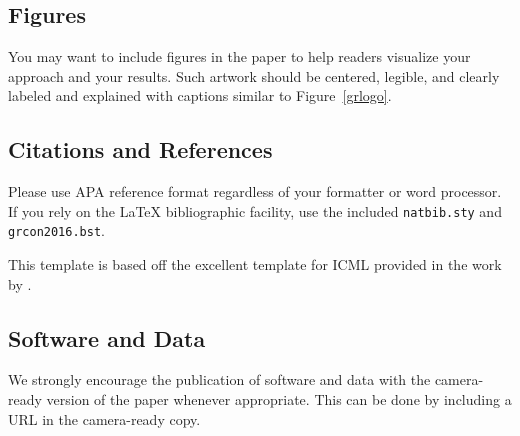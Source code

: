 \documentclass{article}
\begin{document}
\subsection{Figures}
 
You may want to include figures in the paper to help readers visualize
your approach and your results. Such artwork should be centered,
legible, and clearly labeled and explained with captions similar to Figure~\ref{grlogo}.

\subsection{Citations and References} 

Please use APA reference format regardless of your formatter
or word processor. If you rely on the \LaTeX\/ bibliographic 
facility, use the included {\tt natbib.sty} and {\tt grcon2016.bst}.

This template is based off the excellent template for ICML provided
in the work by \cite{langley00}.

\subsection{Software and Data}

We strongly encourage the publication of software and data with the
camera-ready version of the paper whenever appropriate.  This can be
done by including a URL in the camera-ready copy.  



\end{document}
